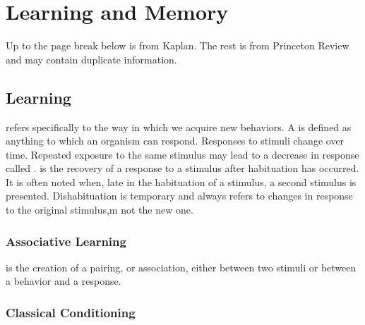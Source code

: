 \documentclass[../Psych_Soci_review.tex]{subfiles}
\begin{document}
\chapter{Learning and Memory\supdag}
Up to the page break below is from Kaplan. The rest is from Princeton Review and may
contain duplicate information.
\section{Learning\supdag}

 refers specifically to the way in which we
acquire new behaviors. A  is defined as anything
to which an organism can respond. Responses to stimuli change
over time. Repeated exposure to the same stimulus may lead to a
decrease in response called .
 is the recovery of a response to a
stimulus after habituation has occurred. It is often noted when,
late in the habituation of a stimulus, a second stimulus is
presented. Dishabituation is temporary and always refers to
changes in response to the original stimulus,m not the new one.

\subsection{Associative Learning\supdag}

 is the creation of a pairing, or association,
either between two stimuli or between a behavior and a response.

\subsection{Classical Conditioning\supdag}
\end{document}
